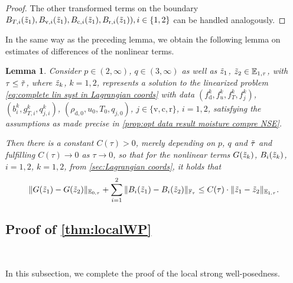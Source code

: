 \documentclass[10pt]{amsart}
\theoremstyle{plain}
\newtheorem{lem}[lem]{Lemma}
\theoremstyle{definition}
\theoremstyle{thm}
\numberwithin{equation}{section}
\newcommand{\E}{\mathbb{E}}
\newcommand{\F}{\mathbb{F}}
\newcommand{\rd}{\mathrm{d}}
\newcommand{\rr}{\mathrm{r}}
\newcommand{\rv}{\mathrm{v}}
\newcommand{\rc}{\mathrm{c}}
\newcommand{\tz}{\Tilde{z}}
\begin{document}
\begin{proof}
The other transformed terms on the boundary $B_{T,i}(\tz_1),B_{\rv,i}(\tz_1),B_{\rc,i}(\tz_1),B_{\rr,i}(\tz_1)), i\in \{1,2\}$ can be handled analogously.
\end{proof}

In the same way as the preceding lemma, we obtain the following lemma on estimates of differences of the nonlinear terms.

\begin{lem}\label{lem: contraction}
Consider $p \in (2,\infty)$, $q \in (3,\infty)$ as well as $\tz_1$, $\tz_2 \in \E_{1,\tau}$, with $\tau \le \Tilde{\tau}$, where $\tz_k$, $k=1,2$, represents a solution to the linearized problem \eqref{eq:complete lin syst in Lagrangian coords} with data $(f_\rd^k,f_u^k,f_T^k,f_j^k)$, $(b_i^k,g_{T,i}^k,q_{j,i}^k)$, $(\rho_{\rd,0},u_0,T_0,q_{j,0})$, $j \in \{\rv,\rc,\rr\}$, $i=1,2$, satisfying the assumptions as made precise in \autoref{prop:opt data result moisture compre NSE}.

Then there is a constant $C(\tau) > 0$, merely depending on $p$, $q$ and $\Tilde{\tau}$ and fulfilling $C(\tau) \to 0$ as $\tau \to 0$, so that for the nonlinear terms $G(\tz_k)$, $B_i(\tz_k)$, $i=1,2$, $k=1,2$, from \autoref{sec:Lagrangian coords}, it holds that
\begin{equation*}
    \| G(\tz_1) - G(\tz_2) \|_{\E_{0,\tau}} + \sum_{i=1}^2 \| B_i(\tz_1) - B_i(\tz_2) \|_{\F_\tau} \le C(\tau) \cdot \| \tz_1 - \tz_2 \|_{\E_{1,\tau}}.
\end{equation*}
\end{lem}

\subsection{Proof of \autoref{thm:localWP}}
\

In this subsection, we complete the proof of the local strong well-posedness.
\end{document}
